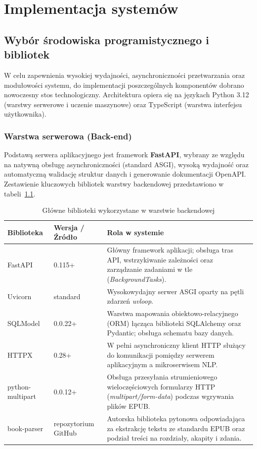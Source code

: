 \chapter{Implementacja systemów}
\section{Wybór środowiska programistycznego i bibliotek}
W celu zapewnienia wysokiej wydajności, asynchroniczności przetwarzania oraz modułowości systemu, do implementacji poszczególnych komponentów dobrano nowoczesny stos technologiczny.
Architektura opiera się na językach Python 3.12 (warstwy serwerowe i uczenie maszynowe) oraz TypeScript (warstwa interfejsu użytkownika).

\subsection{Warstwa serwerowa (Back-end)}
Podstawą serwera aplikacyjnego jest framework \textbf{FastAPI}, wybrany ze względu na natywną obsługę asynchroniczności (standard ASGI), wysoką wydajność oraz automatyczną walidację
struktur danych i generowanie dokumentacji OpenAPI. Zestawienie kluczowych bibliotek warstwy backendowej przedstawiono w tabeli~\ref{tab:backend_libraries}.

\begin{table}[htbp]
    \centering
    \caption{Główne biblioteki wykorzystane w warstwie backendowej}
    \label{tab:backend_libraries}
    \begin{tabular}{l l p{6cm}}
        \toprule
        \textbf{Biblioteka} & \textbf{Wersja / Źródło} & \textbf{Rola w systemie} \\
        \midrule
        FastAPI & 0.115+ & Główny framework aplikacji; obsługa tras API, wstrzykiwanie zależności oraz zarządzanie zadaniami w tle (\textit{BackgroundTasks}). \\
        Uvicorn & standard & Wysokowydajny serwer ASGI oparty na pętli zdarzeń \textit{uvloop}. \\
        SQLModel & 0.0.22+ & Warstwa mapowania obiektowo-relacyjnego (ORM) łącząca biblioteki SQLAlchemy oraz Pydantic; obsługa schematu bazy danych. \\
        HTTPX & 0.28+ & W pełni asynchroniczny klient HTTP służący do komunikacji pomiędzy serwerem aplikacyjnym a mikroserwisem NLP. \\
        python-multipart & 0.0.12+ & Obsługa przesyłania strumieniowego wieloczęściowych formularzy HTTP (\textit{multipart/form-data}) podczas wgrywania plików EPUB. \\
        book-parser & repozytorium GitHub & Autorska biblioteka pytonowa odpowiadająca za ekstrakcję tekstu ze standardu EPUB oraz podział treści na rozdziały, akapity i
        zdania. \\
        \bottomrule
    \end{tabular}
\end{table}

